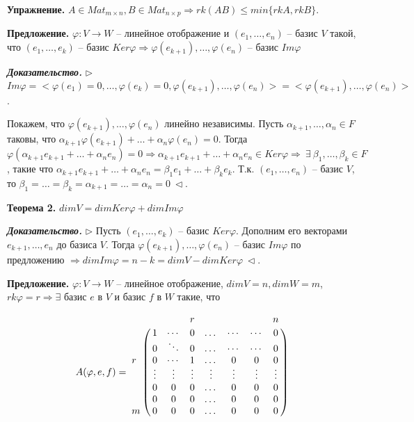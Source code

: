 \vspace{\baselineskip}
\textbf{Упражнение.} $A \in Mat_{m \times n}, B \in Mat_{n \times p} \Rightarrow rk(AB) \leq min\{rk A, rkB\}$.

\vspace{\baselineskip}
\textbf{Предложение.} $\varphi: V \rightarrow W$ -- линейное отображение и $(e_1, \dots, e_n)$ -- базис $V$ такой, что $(e_1, \dots, e_k)$ -- базис $Ker \varphi \Rightarrow \varphi(e_{k+1}), \dots, \varphi(e_n)$ -- базис $Im \varphi$

\vspace{\baselineskip}
\textbf{\textit{Доказательство.}} $\rhd$ $Im \varphi = <\varphi(e_1) = 0, \dots, \varphi(e_k) = 0, \varphi(e_{k+1}), \dots, \varphi(e_n)> = <\varphi(e_{k+1}), \dots, \varphi(e_n)>$.

Покажем, что $\varphi(e_{k+1}), \dots, \varphi(e_n)$ линейно независимы. Пусть $\alpha_{k+1}, \dots, \alpha_n \in F$ таковы, что $\alpha_{k+1} \varphi(e_{k+1}) + \dots + \alpha_n \varphi(e_n) = 0$. Тогда $\varphi(\alpha_{k+1} e_{k+1} + \dots + \alpha_n e_n) = 0 \Rightarrow \alpha_{k+1} e_{k+1} + \dots + \alpha_n e_n \in Ker \varphi \Rightarrow \ \exists \ \beta_1, \dots, \beta_k \in F$, такие что $\alpha_{k+1} e_{k+1} + \dots + \alpha_n e_n = \beta_1 e_1 + \dots + \beta_k e_k$. Т.к. $(e_1, \dots, e_n)$ -- базис $V$, то $\beta_1 = \dots = \beta_k = \alpha_{k+1} = \dots = \alpha_n = 0 \ \lhd$.

\vspace{\baselineskip}
\textbf{Теорема 2.} $dimV = dim Ker \varphi + dim Im \varphi$

\vspace{\baselineskip}
\textbf{\textit{Доказательство.}} $\rhd$ Пусть $(e_1, \dots, e_k)$ -- базис $Ker \varphi$. Дополним его векторами $e_{k+1}, \dots, e_n$ до базиса $V$. Тогда $\varphi(e_{k+1}), \dots, \varphi(e_n)$ -- базис $Im \varphi$ по предложению $\Rightarrow dim Im \varphi = n - k = dim V - dim Ker \varphi \ \lhd$.

\vspace{\baselineskip}
\textbf{Предложение.} $\varphi: V \rightarrow W$ -- линейное отображение, $dim V = n, dim W = m$, $rk \varphi = r \Rightarrow \exists$ базис $e$ в $V$ и базис $f$ в $W$ такие, что 

\[ A(\varphi, e, f) = \bordermatrix{ 
    	 & & & r & & & & n \cr
    	 & 1 & \cdots & 0 & \dots & \cdots & \cdots & 0 \cr 
         & 0 & \ddots & 0 & \dots & \cdots & \cdots & 0 \cr
		r & 0 & \cdots & 1 & \dots & 0 & 0 & 0  \cr
         & \vdots & \vdots & \vdots & \vdots & \vdots & \vdots & \vdots \cr
        & 0 & 0 & 0 & \dots & 0 & 0 & 0  \cr
        & 0 & 0 & 0 & \dots & 0 & 0 & 0  \cr
       m & 0 & 0 & 0 & \dots  & 0 & 0 & 0 }
\]

